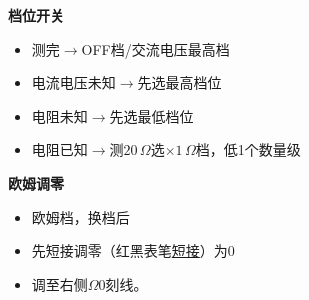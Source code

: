 \textbf{档位开关}
\begin{itemize}
\item 测完$\to$OFF档/交流电压最高档
\item 电流电压未知$\to$先选最高档位
\item 电阻未知$\to$先选最低档位
\item 电阻已知$\to$测$20\,\Omega$选$\times1\,\Omega$档，低1个数量级
\end{itemize}

\textbf{欧姆调零}
\begin{itemize}
\item 欧姆档，换档后
\item 先短接调零（红黑表笔\underline{短接}）为0
\item 调至右侧$\Omega$0刻线。
\end{itemize}

